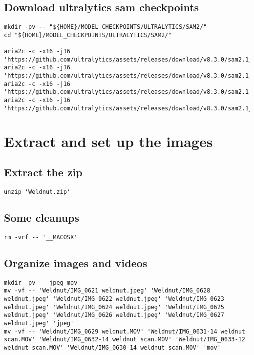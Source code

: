 \documentclass[11pt]{article}
\begin{document}
\subsection{Download ultralytics sam checkpoints}
\label{sec:org06adfd3}
\begin{verbatim}
mkdir -pv -- "${HOME}/MODEL_CHECKPOINTS/ULTRALYTICS/SAM2/"
cd "${HOME}/MODEL_CHECKPOINTS/ULTRALYTICS/SAM2/"

aria2c -c -x16 -j16 'https://github.com/ultralytics/assets/releases/download/v8.3.0/sam2.1_t.pt'
aria2c -c -x16 -j16 'https://github.com/ultralytics/assets/releases/download/v8.3.0/sam2.1_s.pt'
aria2c -c -x16 -j16 'https://github.com/ultralytics/assets/releases/download/v8.3.0/sam2.1_b.pt'
aria2c -c -x16 -j16 'https://github.com/ultralytics/assets/releases/download/v8.3.0/sam2.1_l.pt'
\end{verbatim}
\section{Extract and set up the images}
\label{sec:org82282d9}

\subsection{Extract the zip}
\label{sec:org93a8b43}
\begin{verbatim}
unzip 'Weldnut.zip'
\end{verbatim}
\subsection{Some cleanups}
\label{sec:orgb603262}
\begin{verbatim}
rm -vrf -- '__MACOSX'
\end{verbatim}
\subsection{Organize images and videos}
\label{sec:org18c5db6}
\begin{verbatim}
mkdir -pv -- jpeg mov
mv -vf -- 'Weldnut/IMG_0621 weldnut.jpeg' 'Weldnut/IMG_0628 weldnut.jpeg' 'Weldnut/IMG_0622 weldnut.jpeg' 'Weldnut/IMG_0623 weldnut.jpeg' 'Weldnut/IMG_0624 weldnut.jpeg' 'Weldnut/IMG_0625 weldnut.jpeg' 'Weldnut/IMG_0626 weldnut.jpeg' 'Weldnut/IMG_0627 weldnut.jpeg' 'jpeg'
mv -vf -- 'Weldnut/IMG_0629 weldnut.MOV' 'Weldnut/IMG_0631-14 weldnut scan.MOV' 'Weldnut/IMG_0632-14 weldnut scan.MOV' 'Weldnut/IMG_0633-12 weldnut scan.MOV' 'Weldnut/IMG_0630-14 weldnut scan.MOV' 'mov'
\end{verbatim}
\end{document}

